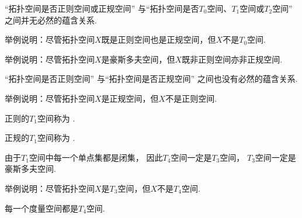 “拓扑空间是否正则空间或正规空间”
与“拓扑空间是否\(T_0\)空间、\(T_1\)空间或\(T_2\)空间”
之间并无必然的蕴含关系.

\begin{example}
举例说明：尽管拓扑空间\(X\)既是正则空间也是正规空间，但\(X\)不是\(T_0\)空间.
\end{example}

\begin{example}
举例说明：尽管拓扑空间\(X\)是豪斯多夫空间，但\(X\)既非正则空间亦非正规空间.
\end{example}

“拓扑空间是否正则空间”
与“拓扑空间是否正规空间”
之间也没有必然的蕴含关系.

\begin{example}
举例说明：尽管拓扑空间\(X\)是正规空间，但\(X\)不是正则空间.
\end{example}

\begin{definition}
正则的\(T_1\)空间称为 .
\end{definition}

\begin{definition}
正规的\(T_1\)空间称为 .
\end{definition}

由于\(T_1\)空间中每一个单点集都是闭集，
因此\(T_4\)空间一定是\(T_3\)空间，
\(T_3\)空间一定是豪斯多夫空间.

\begin{example}
举例说明：尽管拓扑空间\(X\)是\(T_3\)空间，但\(X\)不是\(T_4\)空间.
\end{example}

\begin{theorem}
每一个度量空间都是\(T_4\)空间.
\end{theorem}
